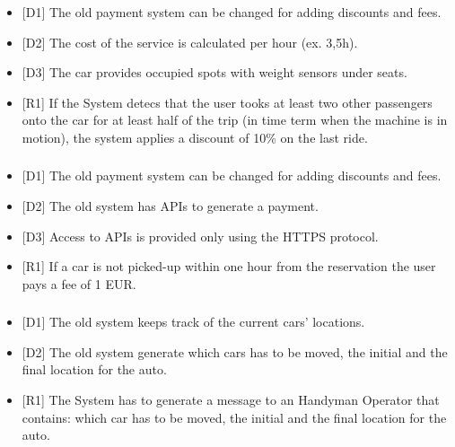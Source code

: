 \subsubsection{\gSystemDiscounts}
\begin{itemize}
	\item {[}D1{]} The old payment system can be changed for adding discounts and fees.
	\item {[}D2{]} The cost of the service is calculated per hour (ex. 3,5h).
	\item {[}D3{]} The car provides occupied spots with weight sensors under seats.
	\item {[}R1{]} If the System detecs that the user tooks at least two other passengers onto the car for at least half of the trip (in time term when the machine is in motion), the system applies a discount of 10\% on the last ride.
\end{itemize}
\subsubsection{\gSystemFees}
\begin{itemize}
	\item {[}D1{]} The old payment system can be changed for adding discounts and fees.
	\item {[}D2{]} The old system has APIs to generate a payment.
	\item {[}D3{]} Access to APIs is provided only using the HTTPS protocol.
	\item {[}R1{]} If a car is not picked-up within one hour from the reservation the user pays a fee of 1 EUR.
\end{itemize}
\subsubsection{\gSystemDistribution}
\begin{itemize}
	\item {[}D1{]} The old system keeps track of the current cars' locations.
	\item {[}D2{]} The old system generate which cars has to be moved, the initial and the final location for the auto.
	\item {[}R1{]} The System has to generate a message to an Handyman Operator that contains: which car has to be moved, the initial and the final location for the auto.
\end{itemize}	
